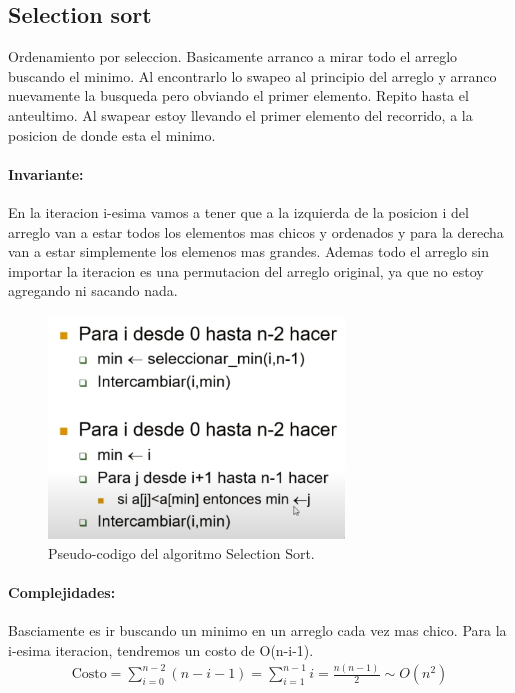 \documentclass[11pt]{article}
\begin{document}
\subsection{Selection sort}
Ordenamiento por seleccion.
Basicamente arranco a mirar todo el arreglo buscando el minimo.
Al encontrarlo lo swapeo al principio del arreglo y arranco
nuevamente la busqueda pero obviando el primer elemento.
Repito hasta el anteultimo.
Al swapear estoy llevando el primer elemento del recorrido, a la
posicion de donde esta el minimo.

\paragraph{Invariante:} En la iteracion i-esima vamos a tener que a la izquierda
de la posicion i del arreglo van a estar todos los elementos
mas chicos y ordenados y para la derecha van a estar simplemente
los elemenos mas grandes.
Ademas todo el arreglo sin importar la iteracion es una permutacion
del arreglo original, ya que no estoy agregando ni sacando nada.

\begin{figure}[h!]
    \centering
    \includegraphics[width=0.7\textwidth]{selection.png}
    \caption{Pseudo-codigo del algoritmo Selection Sort.}
    \label{fig:selection}
\end{figure}

\paragraph{Complejidades:}
Basciamente es ir buscando un minimo en un arreglo cada vez mas chico.
Para la i-esima iteracion, tendremos un costo de O(n-i-1).
\begin{align*}
    \text{Costo} = \sum_{i=0}^{n-2}(n-i-1)=\sum_{i=1}^{n-1}i=\frac{n(n-1)}{2}\sim O(n^2)
\end{align*}
\end{document}
